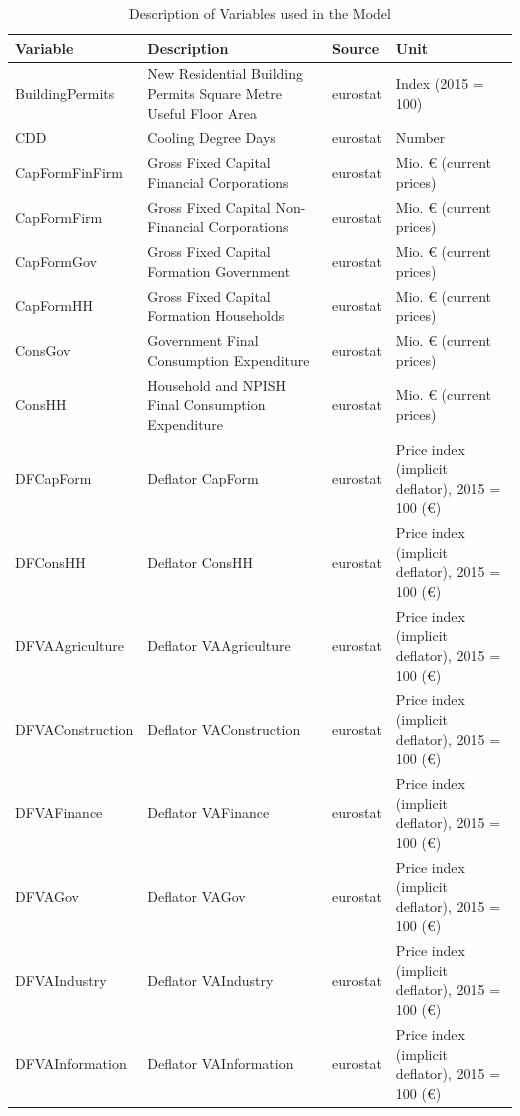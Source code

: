 \begingroup\fontsize{8}{10}\selectfont

\begin{longtable}[t]{>{\raggedright\arraybackslash}p{3.5cm}>{\raggedright\arraybackslash}p{5.5cm}>{\raggedright\arraybackslash}p{2cm}>{\raggedright\arraybackslash}p{4cm}}
\caption{\label{tab:variable_table}Description of Variables used in the Model}\\
\toprule
Variable & Description & Source & Unit\\
\midrule
BuildingPermits & New Residential Building Permits Square Metre Useful Floor Area & eurostat & Index (2015 = 100)\\
CDD & Cooling Degree Days & eurostat & Number\\
CapFormFinFirm & Gross Fixed Capital Financial Corporations & eurostat & Mio. € (current prices)\\
CapFormFirm & Gross Fixed Capital Non-Financial Corporations & eurostat & Mio. € (current prices)\\
CapFormGov & Gross Fixed Capital Formation Government & eurostat & Mio. € (current prices)\\
\addlinespace
CapFormHH & Gross Fixed Capital Formation Households & eurostat & Mio. € (current prices)\\
ConsGov & Government Final Consumption Expenditure & eurostat & Mio. € (current prices)\\
ConsHH & Household and NPISH Final Consumption Expenditure & eurostat & Mio. € (current prices)\\
DFCapForm & Deflator CapForm & eurostat & Price index (implicit deflator), 2015 = 100 (€)\\
DFConsHH & Deflator ConsHH & eurostat & Price index (implicit deflator), 2015 = 100 (€)\\
\addlinespace
DFVAAgriculture & Deflator VAAgriculture & eurostat & Price index (implicit deflator), 2015 = 100 (€)\\
DFVAConstruction & Deflator VAConstruction & eurostat & Price index (implicit deflator), 2015 = 100 (€)\\
DFVAFinance & Deflator VAFinance & eurostat & Price index (implicit deflator), 2015 = 100 (€)\\
DFVAGov & Deflator VAGov & eurostat & Price index (implicit deflator), 2015 = 100 (€)\\
DFVAIndustry & Deflator VAIndustry & eurostat & Price index (implicit deflator), 2015 = 100 (€)\\
\addlinespace
DFVAInformation & Deflator VAInformation & eurostat & Price index (implicit deflator), 2015 = 100 (€)\\

\end{longtable}
